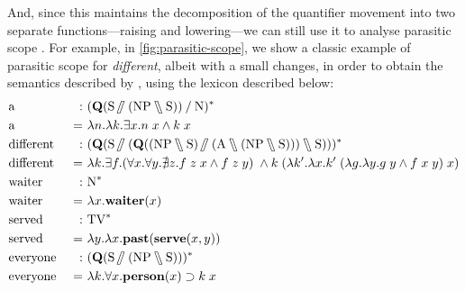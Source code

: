 \documentclass[a4paper]{article}
\begin{document}
And, since this maintains the decomposition of the quantifier movement
into two separate functions---raising and lowering---we can still use
it to analyse parasitic scope \citep{barker2007}. For example, in
\autoref{fig:parasitic-scope}, we show a classic example of parasitic
scope for \emph{different}, albeit with a small changes, in order to
obtain the semantics described by \citet{kiselyov2015b}, using the
lexicon described below:
\begin{alignat*}{3}
    &\a         \ &:&\ \tr[{(\qr[\S\himpl(\NP\himpr\S)]\impl\N)}]
  \\&\a         \ &=&\ \lambda n. \lambda k. \exists x. n\;x\wedge k\;x
  \\&\different \ &:&\ \tr[{(\qr[\S\himpl(\qr[(\NP\himpr\S)\himpl(\A\himpr(\NP\himpr\S))]\himpr\S)])}]
  \\&\different \ &=&\ \lambda k. \exists f. (\forall x.\forall y.\nexists z.f\;z\;x\wedge f\;z\;y)\;\wedge k\;(\lambda k'.\lambda x.k'\;(\lambda g.\lambda y.g\;y\wedge f\;x\;y)\;x)
  \\&\waiter    \ &:&\ \tr[\N]
  \\&\waiter    \ &=&\ \lambda x.\WAITER(x)
  \\&\served    \ &:&\ \tr[\TV]
  \\&\served    \ &=&\ \lambda y.\lambda x.\PAST(\SERVE(x,y))
  \\&\everyone  \ &:&\ \tr[{(\qr[\S\himpl(\NP\himpr\S)])}]
  \\&\everyone  \ &=&\ \lambda k.\forall x.\PERSON(x)\supset k\;x
\end{alignat*}
\end{document}
